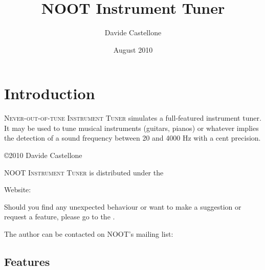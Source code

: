 \newcommand{\noun}[1]{\textsc{#1}}

\makeindex


\author{Davide Castellone}
\title{NOOT Instrument Tuner}
\date{August 2010}
\maketitle
\tableofcontents

\pagestyle{fancyplain}%

\chapter{Introduction}\label{introduction}

\noun{Never-out-of-tune Instrument Tuner} simulates a full-featured instrument tuner. It may
be used to tune musical instruments (guitars, pianos) or whatever
implies the detection of a sound frequency between 20 and 4000 Hz with a cent precision.

\copyright 2010 Davide Castellone

\noun{NOOT Instrument Tuner} is distributed under the


Website: 

Should you find any unexpected behaviour or want to make a suggestion or request a feature,
please go to the .

The author can be contacted on NOOT's mailing list:

\section{Features}\label{features}


